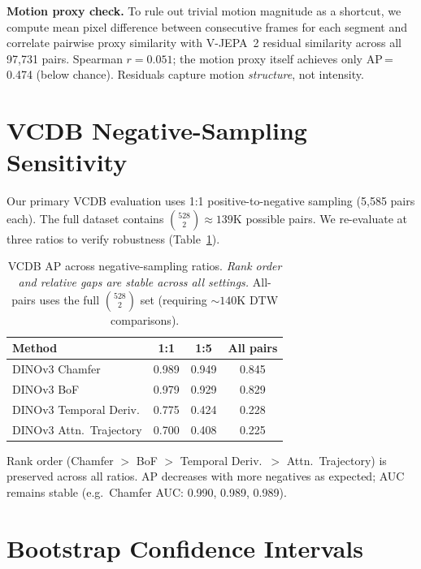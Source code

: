 \documentclass{article}
\theoremstyle{remark}
\begin{document}
\textbf{Motion proxy check.} To rule out trivial motion magnitude as a shortcut, we compute mean pixel difference between consecutive frames for each segment and correlate pairwise proxy similarity with V-JEPA~2 residual similarity across all 97{,}731 pairs. Spearman $r = 0.051$; the motion proxy itself achieves only AP\,=\,0.474 (below chance). Residuals capture motion \emph{structure}, not intensity.

\section{VCDB Negative-Sampling Sensitivity}
\label{sec:neg_sampling}

Our primary VCDB evaluation uses 1:1 positive-to-negative sampling (5{,}585 pairs each). The full dataset contains $\binom{528}{2} \approx 139$K possible pairs. We re-evaluate at three ratios to verify robustness (Table~\ref{tab:neg_sensitivity}).

\begin{table}[h]
\centering
\caption{VCDB AP across negative-sampling ratios. \emph{Rank order and relative gaps are stable across all settings.} All-pairs uses the full $\binom{528}{2}$ set (requiring ${\sim}140$K DTW comparisons).}
\label{tab:neg_sensitivity}
\begin{tabular}{lccc}
\toprule
\textbf{Method} & \textbf{1:1} & \textbf{1:5} & \textbf{All pairs} \\
\midrule
DINOv3 Chamfer           & 0.989 & 0.949 & 0.845 \\
DINOv3 BoF               & 0.979 & 0.929 & 0.829 \\
DINOv3 Temporal Deriv.   & 0.775 & 0.424 & 0.228 \\
DINOv3 Attn.\ Trajectory & 0.700 & 0.408 & 0.225 \\
\bottomrule
\end{tabular}
\begin{flushleft}
\small Rank order (Chamfer $>$ BoF $>$ Temporal Deriv.\ $>$ Attn.\ Trajectory) is preserved across all ratios. AP decreases with more negatives as expected; AUC remains stable (e.g.\ Chamfer AUC: 0.990, 0.989, 0.989).
\end{flushleft}
\end{table}

\section{Bootstrap Confidence Intervals}
\label{sec:bootstrap_cis}
\end{document}

